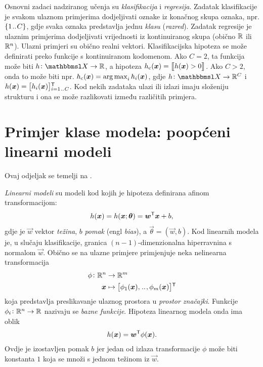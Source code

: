 \documentclass[utf8, diplomski, lmodern]{fer}
\begin{document}
Osnovni zadaci nadziranog učenja su \emph{klasifikacija} i \emph{regresija}. Zadatak klasifikacije je svakom ulaznom primjerima dodjeljivati oznake iz konačnog skupa oznaka, npr. $\cbr{1\bidot C}$, gdje svaka oznaka predstavlja jednu \emph{klasu} (\emph{razred}). Zadatak regresije je ulaznim primjerima dodjeljivati vrijednosti iz kontinuiranog skupa (obično $\mathbb{R}$ ili $\mathbb{R}^n$). Ulazni primjeri su obično realni vektori. Klasifikacijska hipoteza se može definirati preko funkcije s kontinuiranom kodomenom. Ako $C=2$, ta funkcija može biti $\funcdef{h}{\set X}{\R}$, a hipoteza $h_\text{c}(\vec x)=\enbbracket{h(\vec x)>0}$. Ako $C>2$, onda to može biti npr. $h_\text{c}(\vec x)=\argmax_i h_i(\vec x)$, gdje $\funcdef{h}{\set X}{\R^C}$ i $h(\vec x)=\sbr{h_i(\vec x)}_{i=1\bidot C}^\tp$. Kod nekih zadataka ulazi ili izlazi imaju složeniju strukturu i ona se može razlikovati između različitih primjera.



\section{Primjer klase modela: poopćeni linearni modeli}

Ovaj odjeljak se temelji na \citep{Snajder:2014:SU}.

\emph{Linearni modeli} su modeli kod kojih je hipoteza definirana afinom transformacijom:
\begin{align}
h(\vec x) = h(\vec x;\vec\theta) = \vec w^\tp\vec x + b \text{,}
\end{align}
gdje je $\vec w$ vektor \emph{težina}, $b$ \emph{pomak} (engl \textit{bias}), a $\vec\theta=(\vec w, b)$. Kod linearnih modela je, u slučaju klasifikacije, granica $(n-1)$-dimenzionalna hiperravnina s normalom $\vec w$. Obično se na ulazne primjere primjenjuje neka nelinearna transformacija
\begin{align*}
\phi \colon \R^n &\to \R^m \\
\vec x &\mapsto \sbr{\phi_1(\vec x),\bidot,\phi_m(\vec x)}^\tp
\end{align*}
koja predstavlja preslikavanje ulaznog prostora u \emph{prostor značajki}. Funkcije $\phi_i \colon \mathbb{R}^n \to \mathbb{R}$ nazivaju se \emph{bazne funkcije}. Hipoteza linearnog modela onda ima oblik
\begin{align}
h(\vec x) = \vec w^\tp\phi(\vec x) \text{.}
\end{align}
Ovdje je izostavljen pomak $b$ jer jedan od izlaza transformacije $\phi$ može biti konstanta $1$ koja se množi s jednom težinom iz $\vec w$. 
\end{document}
